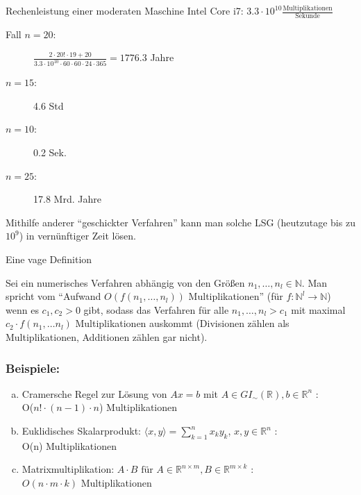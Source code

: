 Rechenleistung einer moderaten Maschine Intel Core i7: $3.3 \cdot 10^{10}
\frac{\text{Multiplikationen}}{\text{Sekunde}}$

\begin{description}
\item[\rm Fall $n = 20$:] $\frac{2 \cdot 20! \cdot 19 + 20}{3.3 \cdot 10^{10}
\cdot 60 \cdot 60 \cdot 24 \cdot 365} = 1776.3$ Jahre
\item[$n = 15$:] 4.6 Std
\item[$n = 10$:] 0.2 Sek.
\item[$n = 25$:] 17.8 Mrd. Jahre
\end{description}

Mithilfe anderer "`geschickter Verfahren"' kann man solche LSG
(heutzutage bis zu $10^9$) in vernünftiger Zeit lösen.

Eine vage Definition

\begin{Definition}
Sei ein numerisches Verfahren abhängig von den
Größen $n_1, \dots, n_l \in \mathbb{N}$. Man spricht vom
"`Aufwand $O(f(n_1, \dots, n_l))$ Multiplikationen"'
(für $f: \mathbb{N}^l \rightarrow \mathbb{N}$) wenn es
$c_1, c_2 > 0$ gibt, sodass das Verfahren für alle
$n_1, \dots, n_l > c_1$ mit maximal $c_2 \cdot f(n_1, \dots n_l)$
Multiplikationen auskommt (Divisionen zählen als Multiplikationen,
Additionen zählen gar nicht).
\end{Definition}

\subsubsection*{Beispiele:}

\begin{enumerate}[(a)]
\item Cramersche Regel zur Lösung von
      $Ax = b$ mit $A \in GI_{\sim}(\mathbb{R}),
      b \in \mathbb{R}^n$ : \\
      O($n! \cdot (n-1)\cdot n$) Multiplikationen
\item Euklidisches Skalarprodukt:
      $\langle x,y\rangle = \sum_{k=1}^n x_k y_k$, $x,y \in \mathbb{R}^n$ :\\
      O(n) Multiplikationen
\item Matrixmultiplikation: $A \cdot B \text{ für } A\in
      \mathbb{R}^{n \times m}, B \in \mathbb{R}^{m \times k}$ : \\
      $O(n \cdot m \cdot k ) $ Multiplikationen
\end{enumerate}

